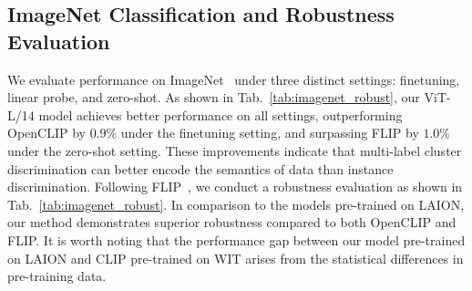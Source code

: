 \begin{table}[t]
    \caption{ImageNet results under finetuning, linear probe, zero-shot, and zero-shot robustness evaluation settings. $\ddag$: Results reported in FLIP paper. Entries in green are the best results using LAION-400M. Here, all methods employ the same backbone of ViT-L/14.}    
    \label{tab:imagenet_robust}
    \vspace{-4mm}
    \centering
\end{table}

\subsection{ImageNet Classification and Robustness Evaluation}

We evaluate performance on ImageNet~\cite{deng2009imagenet} under three distinct settings: finetuning, linear probe, and zero-shot. As shown in Tab.~\ref{tab:imagenet_robust}, our ViT-L/14 model achieves better performance on all settings, outperforming OpenCLIP by $0.9\%$ under the finetuning setting, and surpassing FLIP by $1.0\%$ under the zero-shot setting. These improvements indicate that multi-label cluster discrimination can better encode the semantics of data than instance discrimination. Following FLIP~\cite{li2023scaling}, we conduct a robustness evaluation as shown in Tab.~\ref{tab:imagenet_robust}. In comparison to the models pre-trained on LAION, our method demonstrates superior robustness compared to both OpenCLIP and FLIP. It is worth noting that the performance gap between our model pre-trained on LAION and CLIP pre-trained on WIT arises from the statistical differences in pre-training data.

